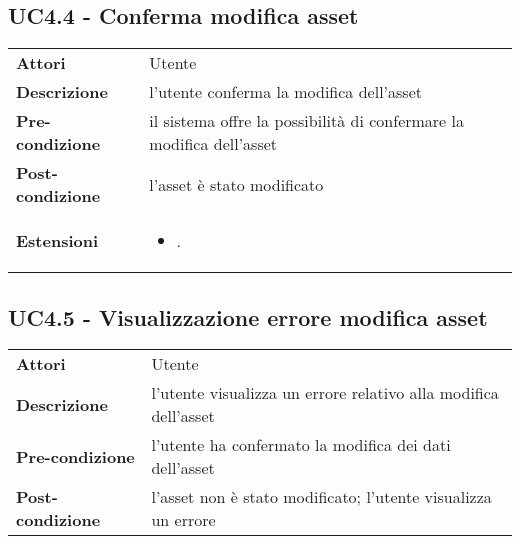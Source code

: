 \subsection{UC4.4 - Conferma modifica asset}
\label{sssec:UC4.4}
\def\arraystretch{1.5}
\begin{tabularx}{\textwidth}{l|p{}}
\rowcolor{I} \multicolumn{2}{c}{\color{white}\textbf{UC4.4 - Conferma modifica asset}} \\
\toprule
\endhead
\textbf{Attori} & Utente\\
\textbf{Descrizione} & l'utente conferma la modifica dell'asset\\
\textbf{Pre-condizione} & il sistema offre la possibilità di confermare la modifica dell'asset\\
\textbf{Post-condizione} & l'asset è stato modificato\\
\textbf{Estensioni} & \vspace{-1.2em}\begin{itemize}[leftmargin=*,noitemsep,nosep]
\item \nameref{sssec:UC4.5}.
\end{itemize}\\
\bottomrule
\end{tabularx}
\subsection{UC4.5 - Visualizzazione errore modifica asset}
\label{sssec:UC4.5}
\def\arraystretch{1.5}
\begin{tabularx}{\textwidth}{l|p{}}
\rowcolor{I} \multicolumn{2}{c}{\color{white}\textbf{UC4.5 - Visualizzazione errore modifica asset}} \\
\toprule
\endhead
\textbf{Attori} & Utente\\
\textbf{Descrizione} & l'utente visualizza un errore relativo alla modifica dell'asset\\
\textbf{Pre-condizione} & l'utente ha confermato la modifica dei dati dell'asset\\
\textbf{Post-condizione} & l'asset non è stato modificato; l'utente visualizza un errore\\
\bottomrule
\end{tabularx}
